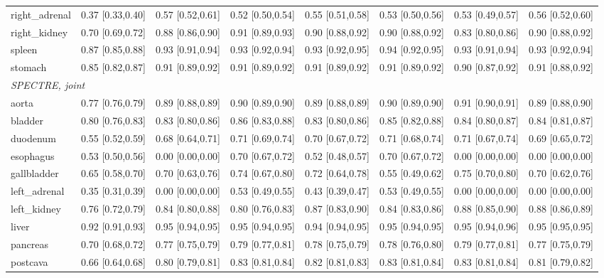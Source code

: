 \begin{tabular}{lccccccc}
right\_adrenal & 0.37 [0.33,0.40] & 0.57 [0.52,0.61] & 0.52 [0.50,0.54] & 0.55 [0.51,0.58] & 0.53 [0.50,0.56] & 0.53 [0.49,0.57] & 0.56 [0.52,0.60] \\
right\_kidney & 0.70 [0.69,0.72] & 0.88 [0.86,0.90] & 0.91 [0.89,0.93] & 0.90 [0.88,0.92] & 0.90 [0.88,0.92] & 0.83 [0.80,0.86] & 0.90 [0.88,0.92] \\
spleen & 0.87 [0.85,0.88] & 0.93 [0.91,0.94] & 0.93 [0.92,0.94] & 0.93 [0.92,0.95] & 0.94 [0.92,0.95] & 0.93 [0.91,0.94] & 0.93 [0.92,0.94] \\
stomach & 0.85 [0.82,0.87] & 0.91 [0.89,0.92] & 0.91 [0.89,0.92] & 0.91 [0.89,0.92] & 0.91 [0.89,0.92] & 0.90 [0.87,0.92] & 0.91 [0.88,0.92] \\
\multicolumn{8}{l}{\textit{SPECTRE, joint}} \\
aorta & 0.77 [0.76,0.79] & 0.89 [0.88,0.89] & 0.90 [0.89,0.90] & 0.89 [0.88,0.89] & 0.90 [0.89,0.90] & 0.91 [0.90,0.91] & 0.89 [0.88,0.90] \\
bladder & 0.80 [0.76,0.83] & 0.83 [0.80,0.86] & 0.86 [0.83,0.88] & 0.83 [0.80,0.86] & 0.85 [0.82,0.88] & 0.84 [0.80,0.87] & 0.84 [0.81,0.87] \\
duodenum & 0.55 [0.52,0.59] & 0.68 [0.64,0.71] & 0.71 [0.69,0.74] & 0.70 [0.67,0.72] & 0.71 [0.68,0.74] & 0.71 [0.67,0.74] & 0.69 [0.65,0.72] \\
esophagus & 0.53 [0.50,0.56] & 0.00 [0.00,0.00] & 0.70 [0.67,0.72] & 0.52 [0.48,0.57] & 0.70 [0.67,0.72] & 0.00 [0.00,0.00] & 0.00 [0.00,0.00] \\
gallbladder & 0.65 [0.58,0.70] & 0.70 [0.63,0.76] & 0.74 [0.67,0.80] & 0.72 [0.64,0.78] & 0.55 [0.49,0.62] & 0.75 [0.70,0.80] & 0.70 [0.62,0.76] \\
left\_adrenal & 0.35 [0.31,0.39] & 0.00 [0.00,0.00] & 0.53 [0.49,0.55] & 0.43 [0.39,0.47] & 0.53 [0.49,0.55] & 0.00 [0.00,0.00] & 0.00 [0.00,0.00] \\
left\_kidney & 0.76 [0.72,0.79] & 0.84 [0.80,0.88] & 0.80 [0.76,0.83] & 0.87 [0.83,0.90] & 0.84 [0.83,0.86] & 0.88 [0.85,0.90] & 0.88 [0.86,0.89] \\
liver & 0.92 [0.91,0.93] & 0.95 [0.94,0.95] & 0.95 [0.94,0.95] & 0.94 [0.94,0.95] & 0.95 [0.94,0.95] & 0.95 [0.94,0.96] & 0.95 [0.95,0.95] \\
pancreas & 0.70 [0.68,0.72] & 0.77 [0.75,0.79] & 0.79 [0.77,0.81] & 0.78 [0.75,0.79] & 0.78 [0.76,0.80] & 0.79 [0.77,0.81] & 0.77 [0.75,0.79] \\
postcava & 0.66 [0.64,0.68] & 0.80 [0.79,0.81] & 0.83 [0.81,0.84] & 0.82 [0.81,0.83] & 0.83 [0.81,0.84] & 0.83 [0.81,0.84] & 0.81 [0.79,0.82] \\

\end{tabular}
